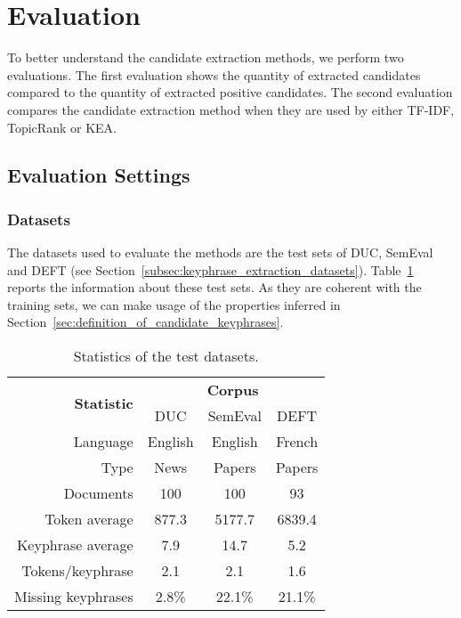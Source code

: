 \section{Evaluation}
\label{sec:evaluation}
  To better understand the candidate extraction methods, we perform two
  evaluations. The first evaluation shows the quantity of extracted candidates
  compared to the quantity of extracted positive candidates. The second
  evaluation compares the candidate extraction method when they are used by
  either TF-IDF, TopicRank or KEA.

  \subsection{Evaluation Settings}
  \label{subsec:evaluation_settings}
    \subsubsection{Datasets}
    \label{subsubsec:datasets}
      The datasets used to evaluate the methods are the test sets of DUC,
      SemEval and DEFT (see Section~\ref{subsec:keyphrase_extraction_datasets}).
      Table~\ref{tab:test_dataset_statistics} reports the information about
      these test sets. As they are coherent with the training sets, we can make
      usage of the properties inferred in
      Section~\ref{sec:definition_of_candidate_keyphrases}.
      \begin{table}
        \centering
        \begin{tabular}{@{~}r@{~}c@{~}c@{~}c@{~}}
          \toprule
          \multirow{2}{*}[-2pt]{\textbf{Statistic}} & \multicolumn{3}{c}{\textbf{Corpus}}\\
          \cmidrule{2-4}
          & DUC & SemEval & DEFT\\
          \midrule
          Language & English & English & French\\
          Type & News & Papers & Papers\\
          Documents & 100 & 100 & 93\\
          Token average & 877.3 & 5177.7 & 6839.4\\
          Keyphrase average & 7.9 & 14.7 & 5.2\\
          Tokens/keyphrase & 2.1 & 2.1 & 1.6\\
          Missing keyphrases & 2.8\% & 22.1\% & 21.1\% \\
          \bottomrule
        \end{tabular}
        \caption{Statistics of the test datasets.
                 \label{tab:test_dataset_statistics}}
      \end{table}

